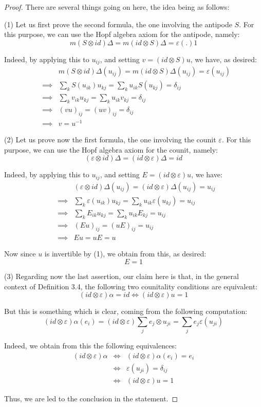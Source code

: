 \documentclass[12pt]{amsbook}
\begin{document}
\begin{proof}
There are several things going on here, the idea being as follows:

\medskip

(1) Let us first prove the second formula, the one involving the antipode $S$. For this purpose, we can use the Hopf algebra axiom for the antipode, namely: 
$$m(S\otimes id)\Delta=m(id\otimes S)\Delta=\varepsilon(.)1$$

Indeed, by applying this to $u_{ij}$, and setting $v=(id\otimes S)u$, we have, as desired:
\begin{eqnarray*}
&&m(S\otimes id)\Delta(u_{ij})=m(id\otimes S)\Delta(u_{ij})=\varepsilon(u_{ij})\\
&\implies&\sum_kS(u_{ik})u_{kj}=\sum_ku_{ik}S(u_{kj})=\delta_{ij}\\
&\implies&\sum_kv_{ik}u_{kj}=\sum_ku_{ik}v_{kj}=\delta_{ij}\\
&\implies&(vu)_{ij}=(uv)_{ij}=\delta_{ij}\\
&\implies&v=u^{-1}
\end{eqnarray*}

(2) Let us prove now the first formula, the one involving the counit $\varepsilon$. For this purpose, we can use the Hopf algebra axiom for the counit, namely: 
$$(\varepsilon\otimes id)\Delta=(id\otimes\varepsilon)\Delta=id$$

Indeed, by applying this to $u_{ij}$, and setting $E=(id\otimes\varepsilon)u$, we have:
\begin{eqnarray*}
&&(\varepsilon\otimes id)\Delta(u_{ij})=(id\otimes\varepsilon)\Delta(u_{ij})=u_{ij}\\
&\implies&\sum_k\varepsilon(u_{ik})u_{kj}=\sum_ku_{ik}\varepsilon(u_{kj})=u_{ij}\\
&\implies&\sum_kE_{ik}u_{kj}=\sum_ku_{ik}E_{kj}=u_{ij}\\
&\implies&(Eu)_{ij}=(uE)_{ij}=u_{ij}\\
&\implies&Eu=uE=u
\end{eqnarray*}

Now since $u$ is invertible by (1), we obtain from this, as desired:
$$E=1$$

(3) Regarding now the last assertion, our claim here is that, in the general context of Definition 3.4, the following two counitality conditions are equivalent:
$$(id\otimes\varepsilon)\alpha=id\iff (id\otimes\varepsilon)u=1$$

But this is something which is clear, coming from the following computation:
$$(id\otimes\varepsilon)\alpha(e_i)
=(id\otimes\varepsilon)\sum_je_j\otimes u_{ji}
=\sum_je_j\varepsilon(u_{ji})$$

Indeed, we obtain from this the following equivalences:
\begin{eqnarray*}
(id\otimes\varepsilon)\alpha
&\iff&(id\otimes\varepsilon)\alpha(e_i)=e_i\\
&\iff&\varepsilon(u_{ji})=\delta_{ij}\\
&\iff&(id\otimes\varepsilon)u=1
\end{eqnarray*}

Thus, we are led to the conclusion in the statement.
\end{proof}
\end{document}
